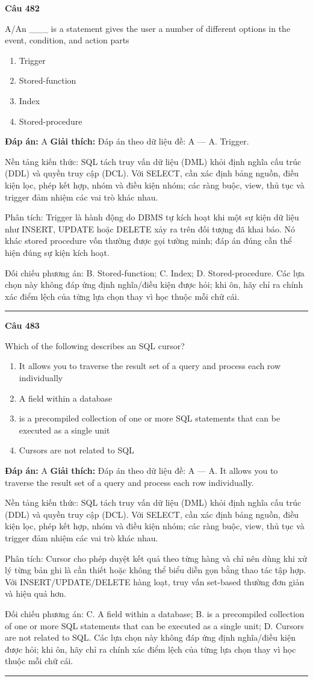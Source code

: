 \documentclass[11pt,a4paper]{article}
\newenvironment{question}[1]{%
  \par\vspace{1em}\noindent\textbf{\large Câu #1}\par\vspace{0.4em}
}{%
  \par\vspace{1em}\hrule\vspace{0.6em}
}
\newenvironment{choices}{%
  \begin{enumerate}[label=\textbf{\Alph*.},leftmargin=2.2em,itemsep=2pt,topsep=3pt]
}{%
  \end{enumerate}
}
\newcommand{\choice}{\item}
\begin{document}
\begin{question}{482}
A/An ___ is a statement gives the user a number of different options in the event, condition, and action parts
\begin{choices}
\choice Trigger
\choice Stored-function
\choice Index
\choice Stored-procedure
\end{choices}
\textbf{Đáp án:} A
\textbf{Giải thích:} Đáp án theo dữ liệu đề: A — A. Trigger.

Nền tảng kiến thức: SQL tách truy vấn dữ liệu (DML) khỏi định nghĩa cấu trúc (DDL) và quyền truy cập (DCL). Với SELECT, cần xác định bảng nguồn, điều kiện lọc, phép kết hợp, nhóm và điều kiện nhóm; các ràng buộc, view, thủ tục và trigger đảm nhiệm các vai trò khác nhau.

Phân tích: Trigger là hành động do DBMS tự kích hoạt khi một sự kiện dữ liệu như INSERT, UPDATE hoặc DELETE xảy ra trên đối tượng đã khai báo. Nó khác stored procedure vốn thường được gọi tường minh; đáp án đúng cần thể hiện đúng sự kiện kích hoạt.

Đối chiếu phương án: B. Stored-function; C. Index; D. Stored-procedure. Các lựa chọn này không đáp ứng định nghĩa/điều kiện được hỏi; khi ôn, hãy chỉ ra chính xác điểm lệch của từng lựa chọn thay vì học thuộc mỗi chữ cái.
\end{question}

\begin{question}{483}
Which of the following describes an SQL cursor?
\begin{choices}
\choice It allows you to traverse the result set of a query and process each row individually
\choice A field within a database
\choice is a precompiled collection of one or more SQL statements that can be executed as a single unit
\choice Cursors are not related to SQL
\end{choices}
\textbf{Đáp án:} A
\textbf{Giải thích:} Đáp án theo dữ liệu đề: A — A. It allows you to traverse the result set of a query and process each row individually.

Nền tảng kiến thức: SQL tách truy vấn dữ liệu (DML) khỏi định nghĩa cấu trúc (DDL) và quyền truy cập (DCL). Với SELECT, cần xác định bảng nguồn, điều kiện lọc, phép kết hợp, nhóm và điều kiện nhóm; các ràng buộc, view, thủ tục và trigger đảm nhiệm các vai trò khác nhau.

Phân tích: Cursor cho phép duyệt kết quả theo từng hàng và chỉ nên dùng khi xử lý từng bản ghi là cần thiết hoặc không thể biểu diễn gọn bằng thao tác tập hợp. Với INSERT/UPDATE/DELETE hàng loạt, truy vấn set-based thường đơn giản và hiệu quả hơn.

Đối chiếu phương án: C. A field within a database; B. is a precompiled collection of one or more SQL statements that can be executed as a single unit; D. Cursors are not related to SQL. Các lựa chọn này không đáp ứng định nghĩa/điều kiện được hỏi; khi ôn, hãy chỉ ra chính xác điểm lệch của từng lựa chọn thay vì học thuộc mỗi chữ cái.
\end{question}
\end{document}
